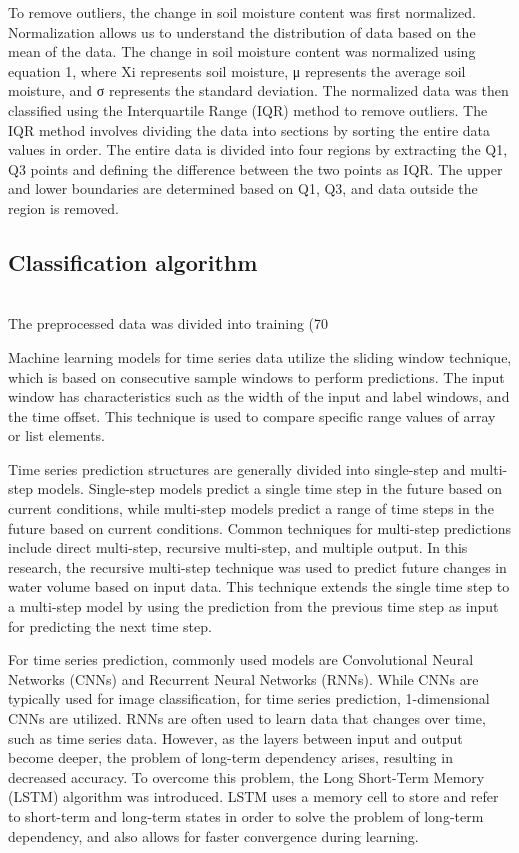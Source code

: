 \documentclass[11pt]{article}
\begin{document}
To remove outliers, the change in soil moisture content was first normalized. Normalization allows us to understand the distribution of data based on the mean of the data. The change in soil moisture content was normalized using equation 1, where Xi represents soil moisture, μ represents the average soil moisture, and σ represents the standard deviation. The normalized data was then classified using the Interquartile Range (IQR) method to remove outliers. The IQR method involves dividing the data into sections by sorting the entire data values in order. The entire data is divided into four regions by extracting the Q1, Q3 points and defining the difference between the two points as IQR. The upper and lower boundaries are determined based on Q1, Q3, and data outside the region is removed.

\subsection{Classification algorithm}
\indent \\The preprocessed data was divided into training (70%

Machine learning models for time series data utilize the sliding window technique, which is based on consecutive sample windows to perform predictions. The input window has characteristics such as the width of the input and label windows, and the time offset. This technique is used to compare specific range values of array or list elements.

Time series prediction structures are generally divided into single-step and multi-step models. Single-step models predict a single time step in the future based on current conditions, while multi-step models predict a range of time steps in the future based on current conditions. Common techniques for multi-step predictions include direct multi-step, recursive multi-step, and multiple output. In this research, the recursive multi-step technique was used to predict future changes in water volume based on input data. This technique extends the single time step to a multi-step model by using the prediction from the previous time step as input for predicting the next time step.

For time series prediction, commonly used models are Convolutional Neural Networks (CNNs) and Recurrent Neural Networks (RNNs). While CNNs are typically used for image classification, for time series prediction, 1-dimensional CNNs are utilized. RNNs are often used to learn data that changes over time, such as time series data. However, as the layers between input and output become deeper, the problem of long-term dependency arises, resulting in decreased accuracy. To overcome this problem, the Long Short-Term Memory (LSTM) algorithm was introduced. LSTM uses a memory cell to store and refer to short-term and long-term states in order to solve the problem of long-term dependency, and also allows for faster convergence during learning.
\end{document}
